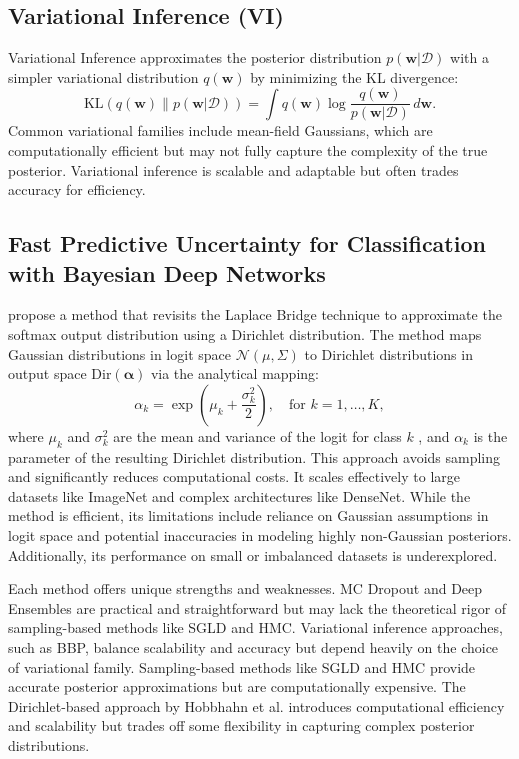 \documentclass{article}
\begin{document}
\subsection{Variational Inference (VI)}
Variational Inference \cite{NIPS2011} approximates the posterior distribution  $p(\mathbf{w} | \mathcal{D})$  with a simpler variational distribution  $q(\mathbf{w})$  by minimizing the KL divergence:
$$
\text{KL}(q(\mathbf{w}) \| p(\mathbf{w} | \mathcal{D})) = \int q(\mathbf{w}) \log \frac{q(\mathbf{w})}{p(\mathbf{w} | \mathcal{D})} \, d\mathbf{w}.
$$
Common variational families include mean-field Gaussians, which are computationally efficient but may not fully capture the complexity of the true posterior. Variational inference is scalable and adaptable but often trades accuracy for efficiency.

\subsection{Fast Predictive Uncertainty for Classification with Bayesian Deep Networks}
\cite{hobbhahn22a} propose a method that revisits the Laplace Bridge technique to approximate the softmax output distribution using a Dirichlet distribution. The method maps Gaussian distributions in logit space  $\mathcal{N}(\mu, \Sigma)$  to Dirichlet distributions in output space  $\text{Dir}(\boldsymbol{\alpha})$  via the analytical mapping:
$$
\alpha_k = \exp\left(\mu_k + \frac{\sigma_k^2}{2}\right), \quad \text{for } k = 1, \ldots, K,
$$
where  $\mu_k$  and  $\sigma_k^2$  are the mean and variance of the logit for class  $k$ , and  $\alpha_k$  is the parameter of the resulting Dirichlet distribution. This approach avoids sampling and significantly reduces computational costs. It scales effectively to large datasets like ImageNet and complex architectures like DenseNet. While the method is efficient, its limitations include reliance on Gaussian assumptions in logit space and potential inaccuracies in modeling highly non-Gaussian posteriors. Additionally, its performance on small or imbalanced datasets is underexplored.

Each method offers unique strengths and weaknesses. MC Dropout and Deep Ensembles are practical and straightforward but may lack the theoretical rigor of sampling-based methods like SGLD and HMC. Variational inference approaches, such as BBP, balance scalability and accuracy but depend heavily on the choice of variational family. Sampling-based methods like SGLD and HMC provide accurate posterior approximations but are computationally expensive. The Dirichlet-based approach by Hobbhahn et al. introduces computational efficiency and scalability but trades off some flexibility in capturing complex posterior distributions.
\end{document}
